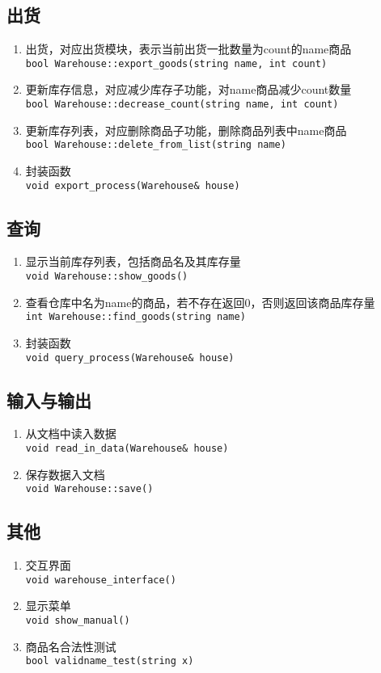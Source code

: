 \documentclass[11pt,UTF8]{ctexart}
\begin{document}
\subsection{出货}
\begin{enumerate}
	\item 出货，对应出货模块，表示当前出货一批数量为count的name商品\\
\verb'bool Warehouse::export_goods(string name, int count)'
	\item 更新库存信息，对应减少库存子功能，对name商品减少count数量\\
\verb'bool Warehouse::decrease_count(string name, int count)'
	\item 更新库存列表，对应删除商品子功能，删除商品列表中name商品\\
\verb'bool Warehouse::delete_from_list(string name)'
	\item 封装函数\\
\verb'void export_process(Warehouse& house)'
\end{enumerate}

\subsection{查询}
\begin{enumerate}
	\item 显示当前库存列表，包括商品名及其库存量\\
\verb'void Warehouse::show_goods()' 
	\item 查看仓库中名为name的商品，若不存在返回$0$，否则返回该商品库存量\\
\verb'int Warehouse::find_goods(string name)'
	\item 封装函数\\
\verb'void query_process(Warehouse& house)'
\end{enumerate}

\subsection{输入与输出}
\begin{enumerate}
	\item 从文档中读入数据\\
\verb'void read_in_data(Warehouse& house)'
	\item 保存数据入文档\\
\verb'void Warehouse::save()'
\end{enumerate}

\subsection{其他}
\begin{enumerate}
	\item 交互界面\\
\verb'void warehouse_interface()'
	\item 显示菜单\\
\verb'void show_manual()'
	\item 商品名合法性测试\\
\verb'bool validname_test(string x)'
\end{enumerate}
\end{document}
